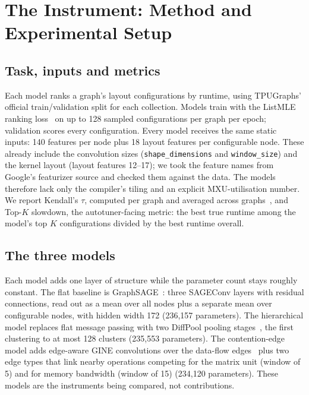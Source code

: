 \section{The Instrument: Method and Experimental Setup}
\label{sec:instrument}

\subsection{Task, inputs and metrics}
\label{sec:task}
Each model ranks a graph's layout configurations by runtime, using TPUGraphs' official train/validation
split for each collection. Models train with the ListMLE ranking loss~\cite{xia2008listwise} on up to
128 sampled configurations per graph per epoch; validation scores every configuration. Every model
receives the same static inputs: 140 features per node plus 18 layout features per configurable node.
These already include the convolution sizes (\texttt{shape\_dimensions} and \texttt{window\_size}) and
the kernel layout (layout features 12--17); we took the feature names from Google's featurizer source
and checked them against the data. The models therefore lack only the compiler's tiling and an
explicit MXU-utilisation number. We report Kendall's $\tau$, computed per graph and averaged across
graphs~\cite{kendall1938measure}, and Top-$K$ slowdown, the autotuner-facing metric: the best true
runtime among the model's top $K$ configurations divided by the best runtime overall.

\subsection{The three models}
\label{sec:models}
Each model adds one layer of structure while the parameter count stays roughly constant. The flat
baseline is GraphSAGE~\cite{hamilton2017inductive}: three SAGEConv layers with residual connections,
read out as a mean over all nodes plus a separate mean over configurable nodes, with hidden width 172
(236,157 parameters). The hierarchical model replaces flat message passing with two DiffPool pooling
stages~\cite{ying2018hierarchical}, the first clustering to at most 128 clusters (235,553 parameters).
The contention-edge model adds edge-aware GINE convolutions over the data-flow
edges~\cite{hu2019strategies} plus two edge types that link nearby operations competing for the matrix
unit (window of 5) and for memory bandwidth (window of 15) (234,120 parameters). These models are the
instruments being compared, not contributions.

